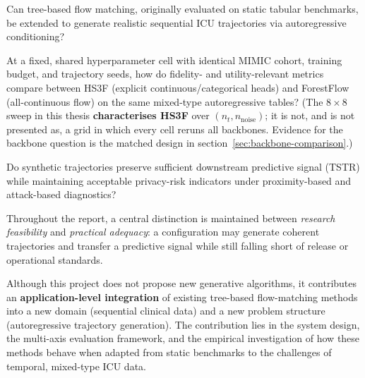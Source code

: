 \documentclass[11pt]{informatics-report}
\begin{document}
\begin{description}[leftmargin=0cm,labelsep=0.6em]
    \item[Feasibility:] Can tree-based flow matching, originally evaluated on static tabular benchmarks, be extended to generate realistic sequential ICU trajectories via autoregressive conditioning?
    \item[Heterogeneous features (matched backbones):] At a fixed, shared hyperparameter cell with identical MIMIC cohort, training budget, and trajectory seeds, how do fidelity- and utility-relevant metrics compare between HS3F (explicit continuous/categorical heads) and ForestFlow (all-continuous flow) on the same mixed-type autoregressive tables? (The $8 \times 8$ sweep in this thesis \textbf{characterises HS3F} over $(n_t, n_{\text{noise}})$; it is not, and is not presented as, a grid in which every cell reruns all backbones. Evidence for the backbone question is the matched design in section~\ref{sec:backbone-comparison}.)
    \item[Utility and privacy:] Do synthetic trajectories preserve sufficient downstream predictive signal (TSTR) while maintaining acceptable privacy-risk indicators under proximity-based and attack-based diagnostics?
\end{description}

Throughout the report, a central distinction is maintained between \emph{research feasibility} and \emph{practical adequacy}: a configuration may generate coherent trajectories and transfer a predictive signal while still falling short of release or operational standards.

Although this project does not propose new generative algorithms, it contributes an \textbf{application-level integration} of existing tree-based flow-matching methods into a new domain (sequential clinical data) and a new problem structure (autoregressive trajectory generation).
The contribution lies in the system design, the multi-axis evaluation framework, and the empirical investigation of how these methods behave when adapted from static benchmarks to the challenges of temporal, mixed-type ICU data.









\end{document}
